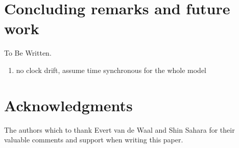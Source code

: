 \section{Concluding remarks and future work}

\noindent To Be Written.

\begin{enumerate}
\item no clock drift, assume time synchronous for the whole model
\end{enumerate}

\section*{Acknowledgments}
The authors which to thank Evert van de Waal and Shin Sahara for their
valuable comments and support when writing this paper.
